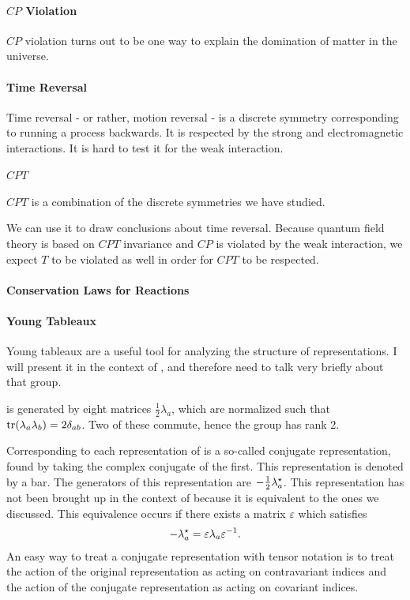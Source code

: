 \paragraph{$CP$ Violation}
$CP$ violation turns out to be one way to explain the domination of matter in the universe.

\paragraph{Time Reversal}
Time reversal - or rather, motion reversal - is a discrete symmetry corresponding to running a process backwards. It is respected by the strong and electromagnetic interactions. It is hard to test it for the weak interaction.

\paragraph{$CPT$}
$CPT$ is a combination of the discrete symmetries we have studied.

We can use it to draw conclusions about time reversal. Because quantum field theory is based on $CPT$ invariance and $CP$ is violated by the weak interaction, we expect $T$ to be violated as well in order for $CPT$ to be respected.

\paragraph{Conservation Laws for Reactions}

\paragraph{Young Tableaux}
Young tableaux are a useful tool for analyzing the structure of representations. I will present it in the context of , and therefore need to talk very briefly about that group.

 is generated by eight matrices $\frac{1}{2}\lambda_{a}$, which are normalized such that $\tr(\lambda_{a}\lambda_{b}) = 2\delta_{ab}$. Two of these commute, hence the group has rank 2.

Corresponding to each representation of  is a so-called conjugate representation, found by taking the complex conjugate of the first. This representation is denoted by a bar. The generators of this representation are $-\frac{1}{2}\lambda_{a}^{\star}$. This representation has not been brought up in the context of  because it is equivalent to the ones we discussed. This equivalence occurs if there exists a matrix $\varepsilon$ which satisfies
\begin{align*}
	-\lambda_{a}^{\star} = \varepsilon\lambda_{a}\varepsilon^{-1}.
\end{align*}
An easy way to treat a conjugate representation with tensor notation is to treat the action of the original representation as acting on contravariant indices and the action of the conjugate representation as acting on covariant indices.

